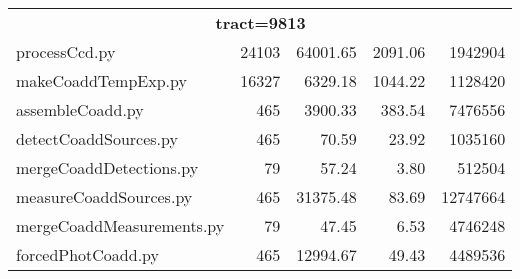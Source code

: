 \begin{table}
\begin{longtable}{lrrrr}
		\hline
		\multicolumn{5}{c}{\textbf{tract=9813}} \\
		processCcd.py & 24103 & 64001.65 & 2091.06 &   1942904 \\
		makeCoaddTempExp.py & 16327 & 6329.18 & 1044.22 &  1128420 \\
		assembleCoadd.py & 465 & 3900.33 & 383.54 &   7476556 \\
		detectCoaddSources.py & 465 & 70.59 & 23.92 & 1035160 \\
		mergeCoaddDetections.py & 79 & 57.24 & 3.80 &   512504 \\
		measureCoaddSources.py & 465 & 31375.48 & 83.69 & 12747664 \\
		mergeCoaddMeasurements.py & 79 &  47.45 & 6.53 &   4746248 \\
		forcedPhotCoadd.py & 465 & 12994.67 & 49.43 &   4489536 \\
		\hline\hline
	\end{longtable}
\end{table}
